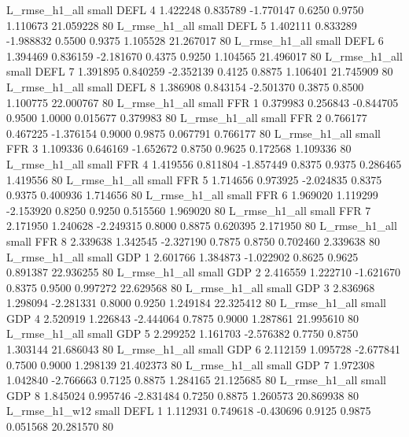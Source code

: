  L_rmse_h1_all      small     DEFL                 4 1.422248 0.835789 -1.770147 0.6250 0.9750  1.110673   21.059228 80
 L_rmse_h1_all      small     DEFL                 5 1.402111 0.833289 -1.988832 0.5500 0.9375  1.105528   21.267017 80
 L_rmse_h1_all      small     DEFL                 6 1.394469 0.836159 -2.181670 0.4375 0.9250  1.104565   21.496017 80
 L_rmse_h1_all      small     DEFL                 7 1.391895 0.840259 -2.352139 0.4125 0.8875  1.106401   21.745909 80
 L_rmse_h1_all      small     DEFL                 8 1.386908 0.843154 -2.501370 0.3875 0.8500  1.100775   22.000767 80
 L_rmse_h1_all      small      FFR                 1 0.379983 0.256843 -0.844705 0.9500 1.0000  0.015677    0.379983 80
 L_rmse_h1_all      small      FFR                 2 0.766177 0.467225 -1.376154 0.9000 0.9875  0.067791    0.766177 80
 L_rmse_h1_all      small      FFR                 3 1.109336 0.646169 -1.652672 0.8750 0.9625  0.172568    1.109336 80
 L_rmse_h1_all      small      FFR                 4 1.419556 0.811804 -1.857449 0.8375 0.9375  0.286465    1.419556 80
 L_rmse_h1_all      small      FFR                 5 1.714656 0.973925 -2.024835 0.8375 0.9375  0.400936    1.714656 80
 L_rmse_h1_all      small      FFR                 6 1.969020 1.119299 -2.153920 0.8250 0.9250  0.515560    1.969020 80
 L_rmse_h1_all      small      FFR                 7 2.171950 1.240628 -2.249315 0.8000 0.8875  0.620395    2.171950 80
 L_rmse_h1_all      small      FFR                 8 2.339638 1.342545 -2.327190 0.7875 0.8750  0.702460    2.339638 80
 L_rmse_h1_all      small      GDP                 1 2.601766 1.384873 -1.022902 0.8625 0.9625  0.891387   22.936255 80
 L_rmse_h1_all      small      GDP                 2 2.416559 1.222710 -1.621670 0.8375 0.9500  0.997272   22.629568 80
 L_rmse_h1_all      small      GDP                 3 2.836968 1.298094 -2.281331 0.8000 0.9250  1.249184   22.325412 80
 L_rmse_h1_all      small      GDP                 4 2.520919 1.226843 -2.444064 0.7875 0.9000  1.287861   21.995610 80
 L_rmse_h1_all      small      GDP                 5 2.299252 1.161703 -2.576382 0.7750 0.8750  1.303144   21.686043 80
 L_rmse_h1_all      small      GDP                 6 2.112159 1.095728 -2.677841 0.7500 0.9000  1.298139   21.402373 80
 L_rmse_h1_all      small      GDP                 7 1.972308 1.042840 -2.766663 0.7125 0.8875  1.284165   21.125685 80
 L_rmse_h1_all      small      GDP                 8 1.845024 0.995746 -2.831484 0.7250 0.8875  1.260573   20.869938 80
 L_rmse_h1_w12      small     DEFL                 1 1.112931 0.749618 -0.430696 0.9125 0.9875  0.051568   20.281570 80
